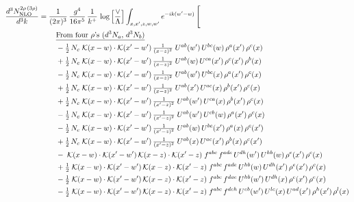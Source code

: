 \documentclass[9pt]{article}
\begin{document}
\begin{align}
\frac{d^{3}N^{2\rho\,(3\rho)}_{\rm NLO}}{d^{3}k}={}&\frac{1}{(2\pi)^{3}}\,\frac{g^{4}}{16\pi^{5}}\,\frac{1}{k^{+}}\,\log\Big[\frac{\vee}{\Lambda}\Big]\int_{x,x',z,w,w'}e^{-ik(w'-w)}\,\Bigg[\notag\\
&\quad\underline{\text{From four $\rho$'s ($d^3N_a$, $d^3N_b$)}}\notag\\
&\quad -\tfrac{1}{2}\,N_c\;\mathcal{K}(x-w)\cdot\mathcal{K}(x'-w')\,\tfrac{1}{(x-z)^{2}}\;U^{ab}(w')\,U^{bc}(w)\,\rho^{a}(x')\,\rho^{c}(x)\notag\\
&\quad +\tfrac{1}{2}\,N_c\;\mathcal{K}(x-w)\cdot\mathcal{K}(x'-w')\,\tfrac{1}{(x-z)^{2}}\;U^{ab}(w)\,U^{ca}(x')\,\rho^{c}(x')\,\rho^{b}(x)\notag\\
&\quad -\tfrac{1}{2}\,N_c\;\mathcal{K}(x-w)\cdot\mathcal{K}(x'-w')\,\tfrac{1}{(x-z)^{2}}\;U^{ab}(w')\,U^{bc}(x)\,\rho^{a}(x')\,\rho^{c}(x)\notag\\
&\quad +\tfrac{1}{2}\,N_c\;\mathcal{K}(x-w)\cdot\mathcal{K}(x'-w')\,\tfrac{1}{(x-z)^{2}}\;U^{ab}(x')\,U^{ac}(x)\,\rho^{b}(x')\,\rho^{c}(x)\notag\\
&\quad +\tfrac{1}{2}\,N_c\;\mathcal{K}(x-w)\cdot\mathcal{K}(x'-w')\,\tfrac{1}{(x'-z)^{2}}\;U^{ab}(w')\,U^{ca}(x)\,\rho^{b}(x')\,\rho^{c}(x)\notag\\
&\quad -\tfrac{1}{2}\,N_c\;\mathcal{K}(x-w)\cdot\mathcal{K}(x'-w')\,\tfrac{1}{(x'-z)^{2}}\;U^{ab}(w')\,U^{cb}(w)\,\rho^{a}(x')\,\rho^{c}(x)\notag\\
&\quad -\tfrac{1}{2}\,N_c\;\mathcal{K}(x-w)\cdot\mathcal{K}(x'-w')\,\tfrac{1}{(x'-z)^{2}}\;U^{ab}(w)\,U^{bc}(x')\,\rho^{a}(x)\,\rho^{c}(x')\notag\\
&\quad +\tfrac{1}{2}\,N_c\;\mathcal{K}(x-w)\cdot\mathcal{K}(x'-w')\,\tfrac{1}{(x'-z)^{2}}\;U^{ab}(x)\,U^{ac}(x')\,\rho^{b}(x)\,\rho^{c}(x')\notag\\
&\quad -\;\mathcal{K}(x-w)\cdot\mathcal{K}(x'-w')\,\mathcal{K}(x-z)\cdot\mathcal{K}(x'-z)\;f^{abc}\,f^{ade}\,U^{dh}(w')\,U^{hb}(w)\,\rho^{e}(x')\,\rho^{c}(x)\notag\\
&\quad +\tfrac{1}{2}\;\mathcal{K}(x-w)\cdot\mathcal{K}(x'-w')\,\mathcal{K}(x-z)\cdot\mathcal{K}(x'-z)\;f^{abc}\,f^{ade}\,U^{hb}(w)\,U^{dh}(x')\,\rho^{e}(x')\,\rho^{c}(x)\notag\\
&\quad -\tfrac{1}{2}\;\mathcal{K}(x-w)\cdot\mathcal{K}(x'-w')\,\mathcal{K}(x-z)\cdot\mathcal{K}(x'-z)\;f^{abc}\,f^{dae}\,U^{hb}(w')\,U^{dh}(x)\,\rho^{c}(x')\,\rho^{e}(x)\notag\\
&\quad -\tfrac{1}{2}\;\mathcal{K}(x-w)\cdot\mathcal{K}(x'-w')\,\mathcal{K}(x-z)\cdot\mathcal{K}(x'-z)\;f^{abc}\,f^{deh}\,U^{eb}(w')\,U^{lc}(x)\,U^{ad}(x')\,\rho^{h}(x')\,\rho^{l}(x)\notag\\

\end{align}
\end{document}

